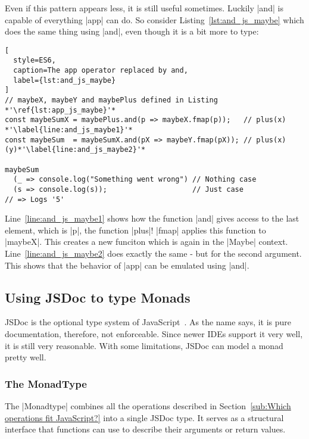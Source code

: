Even if this pattern appears less, it is still useful sometimes. Luckily |and|
is capable of everything |app| can do. So consider
Listing~\ref{lst:and_js_maybe} which does the same thing using |and|, even
though it is a bit more to type:

\begin{lstlisting}[
  style=ES6,
  caption=The app operator replaced by and,
  label={lst:and_js_maybe}
]
// maybeX, maybeY and maybePlus defined in Listing    *'\ref{lst:app_js_maybe}'*
const maybeSumX = maybePlus.and(p => maybeX.fmap(p));   // plus(x) *'\label{line:and_js_maybe1}'*
const maybeSum  = maybeSumX.and(pX => maybeY.fmap(pX)); // plus(x)(y)*'\label{line:and_js_maybe2}'*

maybeSum 
  (_ => console.log("Something went wrong") // Nothing case
  (s => console.log(s));                    // Just case
// => Logs '5'
\end{lstlisting}

Line~\ref{line:and_js_maybe1} shows how the function |and| gives access to the
last element, which is |p|, the function |plus|! |fmap| applies this function
to |maybeX|. This creates a new funciton which is again in the |Maybe|
context. Line~\ref{line:and_js_maybe2} does exactly the same - but for the second
argument. \\ 
This shows that the behavior of |app| can be emulated using |and|.

\subsection{Using JSDoc to type Monads} %
\label{sub:Using JSDoc to type monads}
JSDoc is the optional type system of JavaScript~\cite{jsdoc_use_2023}. As the
name says, it is pure documentation, therefore, not enforceable. Since newer
IDEs support it very well, it is still very reasonable. With some
limitations, JSDoc can model a monad pretty well.

\subsubsection{The MonadType} %
\label{subsub:The MonadType}
The |Monadtype| combines all the operations described in
Section~\ref{sub:Which operations fit JavaScript?} into a single JSDoc type.
It serves as a structural interface that functions can use to describe their
arguments or return values.

